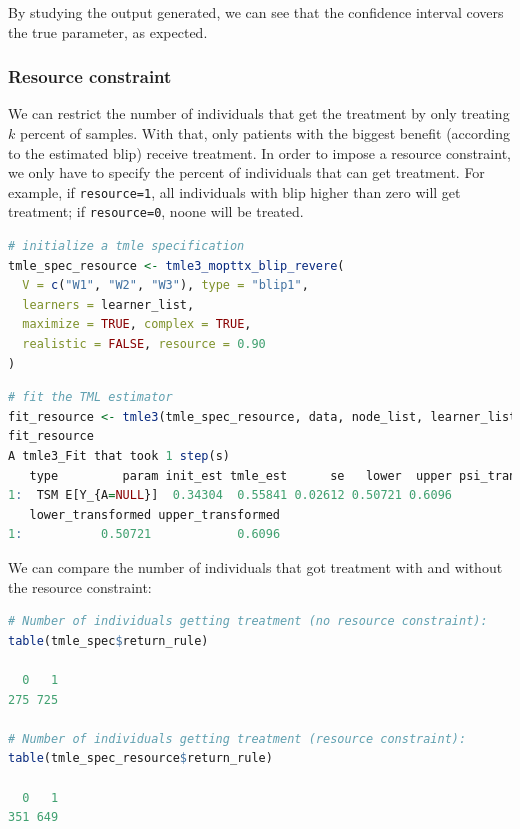\documentclass[
  12pt, krantz2,
]{krantz}
\newcommand{\passthrough}[1]{#1}
\newcommand{\1}{\mathbbm{1}}
\theoremstyle{definition}
\theoremstyle{definition}
\theoremstyle{definition}
\theoremstyle{definition}
\theoremstyle{remark}
\begin{document}
By studying the output generated, we can see that the confidence interval covers the
true parameter, as expected.

\hypertarget{resource-constraint}{%
\subsubsection{Resource constraint}\label{resource-constraint}}

We can restrict the number of individuals that get the treatment by only
treating \(k\) percent of samples. With that, only patients with the biggest benefit (according
to the estimated blip) receive treatment. In order to impose a
resource constraint, we only have to specify the percent of individuals that can
get treatment. For example, if \passthrough{\lstinline!resource=1!}, all
individuals with blip higher than zero will get treatment; if \passthrough{\lstinline!resource=0!},
noone will be treated.

\begin{lstlisting}[language=R]
# initialize a tmle specification
tmle_spec_resource <- tmle3_mopttx_blip_revere(
  V = c("W1", "W2", "W3"), type = "blip1",
  learners = learner_list,
  maximize = TRUE, complex = TRUE,
  realistic = FALSE, resource = 0.90
)
\end{lstlisting}

\begin{lstlisting}[language=R]
# fit the TML estimator
fit_resource <- tmle3(tmle_spec_resource, data, node_list, learner_list)
fit_resource
A tmle3_Fit that took 1 step(s)
   type         param init_est tmle_est      se   lower  upper psi_transformed
1:  TSM E[Y_{A=NULL}]  0.34304  0.55841 0.02612 0.50721 0.6096         0.55841
   lower_transformed upper_transformed
1:           0.50721            0.6096
\end{lstlisting}

We can compare the number of individuals that got treatment with and without the
resource constraint:

\begin{lstlisting}[language=R]
# Number of individuals getting treatment (no resource constraint):
table(tmle_spec$return_rule)

  0   1 
275 725 

# Number of individuals getting treatment (resource constraint):
table(tmle_spec_resource$return_rule)

  0   1 
351 649 
\end{lstlisting}
\end{document}
